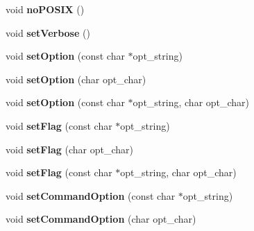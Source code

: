\begin{DoxyCompactItemize}
\item 
\hypertarget{class_any_option_aeca5328f5046690e0d381c745c1872d5}{void {\bfseries no\-P\-O\-S\-I\-X} ()}\label{class_any_option_aeca5328f5046690e0d381c745c1872d5}

\item 
\hypertarget{class_any_option_a0db06dc9828c5242889610afcc740141}{void {\bfseries set\-Verbose} ()}\label{class_any_option_a0db06dc9828c5242889610afcc740141}

\item 
\hypertarget{class_any_option_a72320922fa1b9f02d7e744f517dcf479}{void {\bfseries set\-Option} (const char $\ast$opt\-\_\-string)}\label{class_any_option_a72320922fa1b9f02d7e744f517dcf479}

\item 
\hypertarget{class_any_option_a45d3a142b3b222239640cb15febba737}{void {\bfseries set\-Option} (char opt\-\_\-char)}\label{class_any_option_a45d3a142b3b222239640cb15febba737}

\item 
\hypertarget{class_any_option_abc37993c84c44c368e9ec1d425c913f5}{void {\bfseries set\-Option} (const char $\ast$opt\-\_\-string, char opt\-\_\-char)}\label{class_any_option_abc37993c84c44c368e9ec1d425c913f5}

\item 
\hypertarget{class_any_option_a674db5274da842af95a58067e49a8808}{void {\bfseries set\-Flag} (const char $\ast$opt\-\_\-string)}\label{class_any_option_a674db5274da842af95a58067e49a8808}

\item 
\hypertarget{class_any_option_a1e90db23b41021bd60d4ecdf0e169eb4}{void {\bfseries set\-Flag} (char opt\-\_\-char)}\label{class_any_option_a1e90db23b41021bd60d4ecdf0e169eb4}

\item 
\hypertarget{class_any_option_a6b644d13279528d3c501323f9826f103}{void {\bfseries set\-Flag} (const char $\ast$opt\-\_\-string, char opt\-\_\-char)}\label{class_any_option_a6b644d13279528d3c501323f9826f103}

\item 
\hypertarget{class_any_option_a7df8a4d9c0970f018c91b04bd4c11022}{void {\bfseries set\-Command\-Option} (const char $\ast$opt\-\_\-string)}\label{class_any_option_a7df8a4d9c0970f018c91b04bd4c11022}

\item 
\hypertarget{class_any_option_a639b708b4c3953e7017f224b9b8082b3}{void {\bfseries set\-Command\-Option} (char opt\-\_\-char)}\label{class_any_option_a639b708b4c3953e7017f224b9b8082b3}


\end{DoxyCompactItemize}
